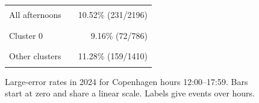 \begin{figure}[!t]
\centering
\small
\begin{tabular}{@{}llr@{}}
All afternoons & \rule{52.60pt}{5pt} & 10.52\% (231/2196) \\
Cluster 0 & \rule{45.80pt}{5pt} & 9.16\% (72/786) \\
Other clusters & \rule{56.38pt}{5pt} & 11.28\% (159/1410) \\
\end{tabular}
\caption{Large-error rates in 2024 for Copenhagen hours 12:00--17:59.
Bars start at zero and share a linear scale. Labels give events over hours.}
\label{fig:afternoon}
\end{figure}
